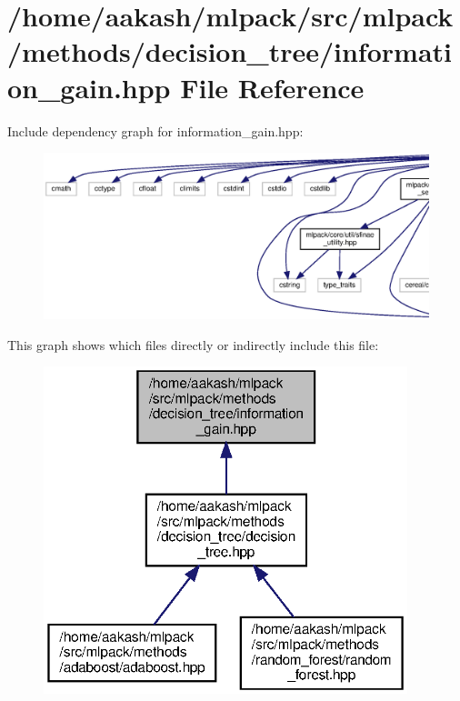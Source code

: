 \section{/home/aakash/mlpack/src/mlpack/methods/decision\+\_\+tree/information\+\_\+gain.hpp File Reference}
\label{decision__tree_2information__gain_8hpp}
Include dependency graph for information\+\_\+gain.\+hpp\+:
\nopagebreak
\begin{figure}[H]
\begin{center}
\leavevmode
\includegraphics[width=350pt]{decision__tree_2information__gain_8hpp__incl}
\end{center}
\end{figure}
This graph shows which files directly or indirectly include this file\+:
\nopagebreak
\begin{figure}[H]
\begin{center}
\leavevmode
\includegraphics[width=300pt]{decision__tree_2information__gain_8hpp__dep__incl}
\end{center}
\end{figure}
